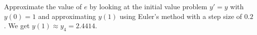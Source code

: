 {Approximate the value of $e$ by looking at the initial value problem
$y'=y$ with $y(0)=1$ and approximating $y(1)$ using Euler's method with
a step size of $0.2$.}
{We get $y(1)\approx y_4 = 2.4414$.}